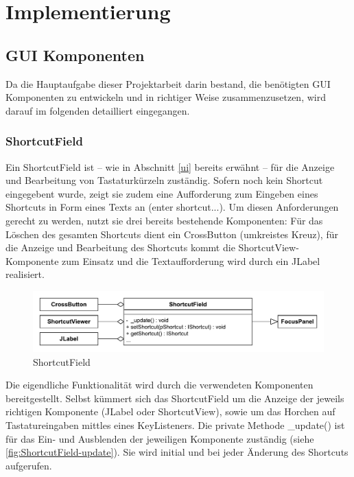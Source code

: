 \section{Implementierung}

\subsection{GUI Komponenten}

Da die Hauptaufgabe dieser Projektarbeit darin bestand, die benötigten GUI Komponenten zu entwickeln und in richtiger Weise zusammenzusetzen, wird darauf im folgenden detailliert eingegangen.

\subsubsection{ShortcutField}

Ein ShortcutField ist -- wie in Abschnitt \ref{ui} bereits erwähnt -- für die Anzeige und Bearbeitung von Tastaturkürzeln zuständig. Sofern noch kein Shortcut eingegebent wurde, zeigt sie zudem eine Aufforderung zum Eingeben eines Shortcuts in Form eines Texts an (\glqq enter shortcut...\grqq). Um diesen Anforderungen gerecht zu werden, nutzt sie drei bereits bestehende Komponenten: Für das Löschen des gesamten Shortcuts dient ein CrossButton (umkreistes Kreuz), für die Anzeige und Bearbeitung des Shortcuts kommt die ShortcutView-Komponente zum Einsatz und die Textaufforderung wird durch ein JLabel realisiert.

\begin{figure}[H]
	\centering
	\includegraphics[width=0.8\linewidth]{../graphic/diagrams/CD_ShortcutField/ShortcutField}
	\caption{ShortcutField}
	\label{fig:shortcutfield}
\end{figure}

Die eigendliche Funktionalität wird durch die verwendeten Komponenten bereitgestellt. Selbst kümmert sich das ShortcutField um die Anzeige der jeweils richtigen Komponente (JLabel oder ShortcutView), sowie um das Horchen auf Tastatureingaben mittles eines KeyListeners. Die private Methode \_update() ist für das Ein- und Ausblenden der jeweiligen Komponente zuständig (siehe \autoref{fig:ShortcutField-update}). Sie wird initial und bei jeder Änderung des Shortcuts aufgerufen.

